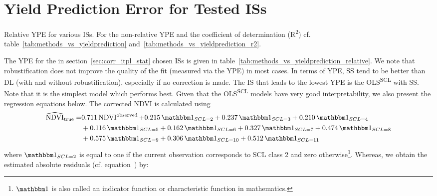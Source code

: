 \section{Yield Prediction Error for Tested ISs} \label{sec:results_ndvi_corr}
	\begin{table}
		\begin{center}
			\caption[relative RMSE for yield prediction in t/ha]{Relative YPE for various ISs. For the non-relative YPE and the coefficient of determination (R\textsuperscript{2}) cf. table~\ref{tab:methods_vs_yieldprediction} and~\ref{tab:methods_vs_yieldprediction_r2}.}
			\small
			
			\label{tab:methods_vs_yieldprediction_relative}
			\normalsize
		\end{center}
	\end{table}
	The YPE for the in section~\ref{sec:corr_itpl_stat} chosen {{IS}}s is given in table~\ref{tab:methods_vs_yieldprediction_relative}. We note that robustification does not improve the quality of the fit (measured via the YPE) in most cases. 
	In terms of YPE, SS tend to be better than DL (with and without robustification), especially if no correction is made. The {{IS}} that leads to the lowest YPE is the OLS\textsuperscript{SCL} with SS. Note that it is the simplest model which performs best. Given that the OLS\textsuperscript{SCL} models have very good interpretability, we also present the regression equations below. The corrected NDVI is calculated using 
	\begin{equation}\label{eq:corr_lm}
		\begin{aligned}		
			{\widehat{\operatorname{NDVI}}}_{\text{true}}  = &
			0.711 \operatorname{NDVI}^\text{observed}  
			+ 0.215 \,\mathbbm 1_{{SCL = 2}} 
			+ 0.237 \,\mathbbm 1_{{SCL = 3}} 
			+ 0.210 \,\mathbbm 1_{{SCL = 4}} \\ &
			+ 0.116 \,\mathbbm 1_{{SCL = 5}} 
			+ 0.162 \,\mathbbm 1_{{SCL = 6}} 
			+ 0.327 \,\mathbbm 1_{{SCL = 7}} 
			+ 0.474 \,\mathbbm 1_{{SCL = 8}} \\ &
			+ 0.575 \,\mathbbm 1_{{SCL = 9}} 
			+ 0.306 \,\mathbbm 1_{{SCL = 10}} 
			+ 0.512 \,\mathbbm 1_{{SCL = 11}} 
		\end{aligned}
	\end{equation} 
	where $\mathbbm 1_{{SCL = 2}}$ is equal to one if the current observation corresponds to SCL class 2 and zero otherwise\footnote{$\mathbbm 1$ is also called an indicator function or characteristic function in mathematics.}. Whereas, we obtain the estimated absolute residuals (cf. equation~) by: 
